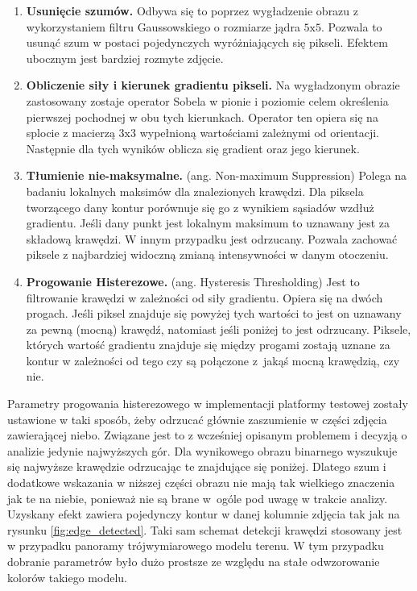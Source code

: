 \begin{enumerate}
    \item \textbf{Usunięcie szumów.} Odbywa się to poprzez wygładzenie obrazu z wykorzystaniem filtru Gaussowskiego \cite{GaussianBlur} o rozmiarze jądra $5\textrm{x}5$. Pozwala to usunąć szum w postaci pojedynczych wyróżniających się pikseli. Efektem ubocznym jest bardziej rozmyte zdjęcie. 
    \item \textbf{Obliczenie siły i kierunek gradientu pikseli.} Na wygładzonym obrazie zastosowany zostaje operator Sobela \cite{Sobel} w pionie i poziomie celem określenia pierwszej pochodnej w obu tych kierunkach. Operator ten opiera się na splocie z macierzą $3\textrm{x}3$ wypełnioną wartościami zależnymi od orientacji. Następnie dla tych wyników oblicza się gradient oraz jego kierunek.
    \item \textbf{Tłumienie nie-maksymalne.} (ang. Non-maximum Suppression) \cite{Non-maximumSuppression} Polega na badaniu lokalnych maksimów dla znalezionych krawędzi. Dla piksela tworzącego dany kontur porównuje się go z wynikiem sąsiadów wzdłuż gradientu. Jeśli dany punkt jest lokalnym maksimum to uznawany jest za składową krawędzi. W innym przypadku jest odrzucany. Pozwala zachować piksele z najbardziej widoczną zmianą intensywności w danym otoczeniu.
    \item \textbf{Progowanie Histerezowe.} (ang. Hysteresis Thresholding) \cite{LectureComputerVision} Jest to filtrowanie krawędzi w zależności od siły gradientu. Opiera się na dwóch progach. Jeśli piksel znajduje się powyżej tych wartości to jest on uznawany za pewną (mocną) krawędź, natomiast jeśli poniżej to jest odrzucany. Piksele, których wartość gradientu znajduje się między progami zostają uznane za kontur w zależności od tego czy są połączone z~jakąś mocną krawędzią, czy nie.
\end{enumerate}

\vspace{5mm}

Parametry progowania histerezowego w implementacji platformy testowej zostały ustawione w taki sposób, żeby odrzucać głównie zaszumienie w części zdjęcia zawierającej niebo. Związane jest to z wcześniej opisanym problemem i decyzją o analizie jedynie najwyższych gór. Dla wynikowego obrazu binarnego wyszukuje się najwyższe krawędzie odrzucając te znajdujące się poniżej. Dlatego szum i dodatkowe wskazania w niższej części obrazu nie mają tak wielkiego znaczenia jak te na niebie, ponieważ nie są brane w~ogóle pod uwagę w trakcie analizy. Uzyskany efekt zawiera pojedynczy kontur w danej kolumnie zdjęcia tak jak na rysunku \ref{fig:edge_detected}. Taki sam schemat detekcji krawędzi stosowany jest w przypadku panoramy trójwymiarowego modelu terenu. W tym przypadku dobranie parametrów było dużo prostsze ze względu na stałe odwzorowanie kolorów takiego modelu. 

